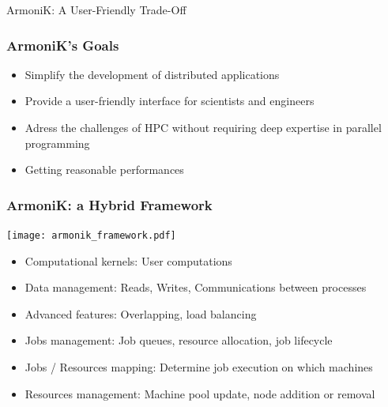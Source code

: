 \documentclass[10pt,aspectratio=1609]{beamer}
\begin{document}
\begin{section}{ArmoniK: A User-Friendly Trade-Off}
 \begin{frame}
   \frametitle{ArmoniK's Goals}
   \begin{itemize}
     \item Simplify the development of distributed applications
     \item Provide a user-friendly interface for scientists and engineers
     \item Adress the challenges of HPC without requiring deep expertise in parallel programming
     \item Getting reasonable performances
   \end{itemize}
 \end{frame}

 \begin{frame}
   \frametitle{ArmoniK: a Hybrid Framework}
   \texttt{[image: armonik\_framework.pdf]}
   \begin{itemize}
     \item Computational kernels: User computations
     \item Data management: Reads, Writes, Communications between processes
     \item Advanced features: Overlapping, load balancing
     \item Jobs management: Job queues, resource allocation, job lifecycle
     \item Jobs / Resources mapping: Determine job execution on which machines
     \item Resources management: Machine pool update, node addition or removal
   \end{itemize}
 \end{frame}



\end{section}
\end{document}
